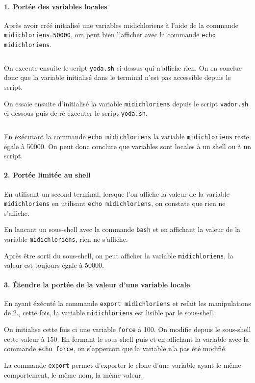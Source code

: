 \paragraph{1. Portée des variables locales}
Après avoir créé initialisé une variables midichloriens à l'aide de la commande \texttt{midichloriens=50000}, om peut bien l'afficher avec la commande \texttt{echo midichloriens}.
\inputminted{bash}{../sources/shell/TP1-2/ex7-yoda.sh}
On execute ensuite le script \texttt{yoda.sh} ci-dessus qui n'affiche rien. On en conclue donc que la variable initialisé dans le terminal n'est pas accessible depuis le script. \par
On essaie ensuite d'initialisé la variable \texttt{midichloriens} depuis le script \texttt{vador.sh} ci-dessous puis de ré-executer le script \texttt{yoda.sh}.
\inputminted{bash}{../sources/shell/TP1-2/ex7-vador.sh}
En éxécutant la commande \texttt{echo midichloriens} la variable \texttt{midichloriens} reste égale à 50000. On peut donc conclure que variables sont locales à un shell ou à un script.

\paragraph{2. Portée limitée au shell}
En utilisant un second terminal, lorsque l’on affiche la valeur de la variable \texttt{midichloriens} en utilisant \texttt{echo midichloriens}, on constate que rien ne s’affiche. \par
En lancant un sous-shell avec la commande \texttt{bash} et en affichant la valeur de la variable \texttt{midichloriens}, rien ne s’affiche. \par
Après être sorti du sous-shell, on peut afficher la variable \texttt{midichloriens}, la valeur est toujours égale à 50000.

\paragraph{3. Étendre la portée de la valeur d’une variable locale}
En ayant éxécuté la commande \texttt{export midichloriens} et refait les manipulations de {2.}, cette fois, la variable \texttt{midichloriens} est lisible par le sous-shell. \par
On initialise cette fois ci une variable \texttt{force} à 100. On modifie depuis le sous-shell cette valeur à 150. En fermant le sous-shell puis et en affichant la variable avec la commande \texttt{echo force}, on s'appercoit que la variable n'a pas été modifié. \par
La commande \texttt{export} permet d'exporter le clone d'une variable ayant le même comportement, le même nom, la même valeur.
